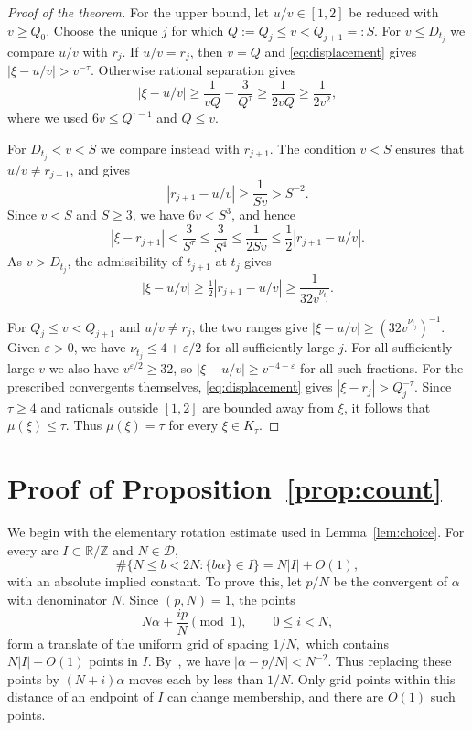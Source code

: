 \documentclass[11pt,reqno]{amsart}
\theoremstyle{definition}
\newcommand{\DD}{\mathcal D}
\begin{document}
\begin{proof}[Proof of the theorem]
For the upper bound, let $u/v\in[1,2]$ be reduced with $v\ge Q_0$.
Choose the unique $j$ for which $Q:=Q_j\le v<Q_{j+1}=:S$.
For $v\le D_{t_j}$ we compare $u/v$ with $r_j$. If $u/v=r_j$,
then $v=Q$ and \eqref{eq:displacement} gives $|\xi-u/v|>v^{-\tau}$.
Otherwise rational separation gives
\[
 |\xi-u/v|\ge\frac1{vQ}-\frac3{Q^\tau}
 \ge\frac1{2vQ}\ge\frac1{2v^2},
\]
where we used $6v\le Q^{\tau-1}$ and $Q\le v$.

For $D_{t_j}<v<S$ we compare instead with $r_{j+1}$. The condition
$v<S$ ensures that $u/v\ne r_{j+1}$, and gives
\[
 |r_{j+1}-u/v|\ge\frac1{Sv}>S^{-2}.
\]
Since $v<S$ and $S\ge3$, we have $6v<S^3$, and hence
\[
 |\xi-r_{j+1}|<\frac3{S^\tau}\le\frac3{S^4}
 \le\frac1{2Sv}
 \le\frac12|r_{j+1}-u/v|.
\]
As $v>D_{t_j}$, the admissibility of $t_{j+1}$ at
$t_j$ gives
\[
 |\xi-u/v|\ge\tfrac12|r_{j+1}-u/v|
 \ge \frac1{32v^{\nu_{t_j}}}.
\]

For $Q_j\le v<Q_{j+1}$ and $u/v\ne r_j$, the two ranges give
$|\xi-u/v|\ge(32v^{\nu_{t_j}})^{-1}$. Given $\varepsilon>0$, we have
$\nu_{t_j}\le4+\varepsilon/2$ for all sufficiently large $j$.
For all sufficiently large $v$ we also have $v^{\varepsilon/2}\ge32$,
so $|\xi-u/v|\ge v^{-4-\varepsilon}$ for all such fractions.
For the prescribed convergents themselves, \eqref{eq:displacement}
gives $|\xi-r_j|>Q_j^{-\tau}$. Since $\tau\ge4$ and rationals
outside $[1,2]$ are bounded away from $\xi$, it follows that
$\mu(\xi)\le\tau$. Thus $\mu(\xi)=\tau$ for every $\xi\in K_\tau$.
\end{proof}

\section{Proof of Proposition~\ref{prop:count}}\label{sec:count}

We begin with the elementary rotation estimate used in
Lemma~\ref{lem:choice}. For every arc
$I\subset\mathbb R/\mathbb Z$ and $N\in\DD$,
\begin{equation}\label{eq:grid}
 \#\{N\le b<2N:\{b\alpha\}\in I\}
 =N|I|+O(1),
\end{equation}
with an absolute implied constant. To prove this, let
$p/N$ be the convergent of $\alpha$ with denominator $N$.
Since $(p,N)=1$, the points
\[
 N\alpha+\frac{ip}{N}\pmod 1,
 \qquad 0\le i<N,
\]
form a translate of the uniform grid of spacing $1/N,
$ which contains $N|I|+O(1)$ points in $I$.
By~\cite[Corollary~1.4, p.~10]{Bugeaud},
we have $|\alpha-p/N|<N^{-2}$. Thus replacing these
points by $(N+i)\alpha$ moves each by less than $1/N$.
Only grid points within this distance of an endpoint
of $I$ can change membership, and there are $O(1)$ such points.
\end{document}
